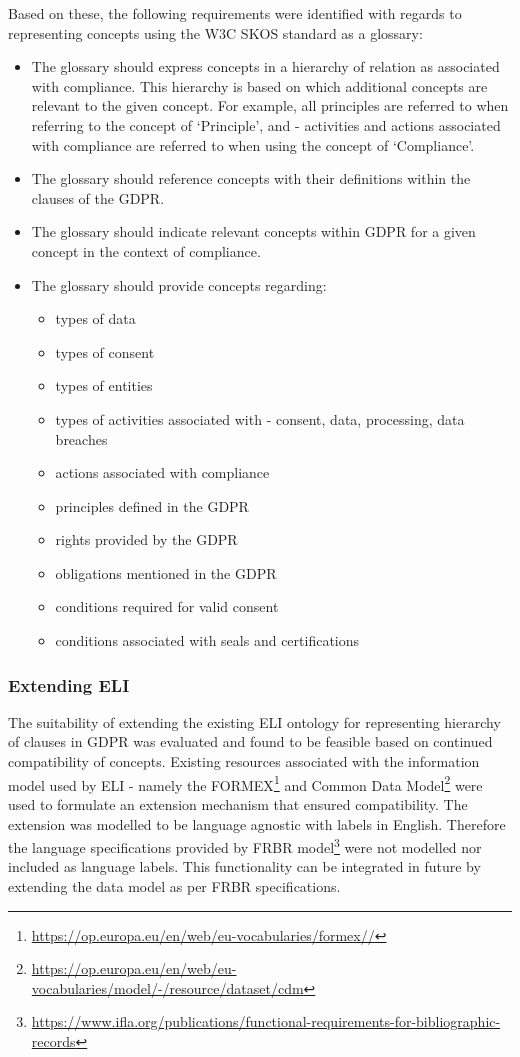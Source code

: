Based on these, the following requirements were identified with regards to representing concepts using the W3C SKOS standard as a glossary:
\begin{itemize}
    \item The glossary should express concepts in a hierarchy of relation as associated with compliance. This hierarchy is based on which additional concepts are relevant to the given concept. For example, all principles are referred to when referring to the concept of `Principle', and - activities and actions associated with compliance are referred to when using the concept of `Compliance'.
    \item The glossary should reference concepts with their definitions within the clauses of the GDPR.
    \item The glossary should indicate relevant concepts within GDPR for a given concept in the context of compliance.
    \item The glossary should provide concepts regarding:
    \begin{itemize}
        \item types of data
        \item types of consent
        \item types of entities
        \item types of activities associated with - consent, data, processing, data breaches
        \item actions associated with compliance
        \item principles defined in the GDPR
        \item rights provided by the GDPR
        \item obligations mentioned in the GDPR
        \item conditions required for valid consent
        \item conditions associated with seals and certifications
    \end{itemize}
\end{itemize}

\subsubsection{Extending ELI}
The suitability of extending the existing ELI ontology for representing hierarchy of clauses in GDPR was evaluated and found to be feasible based on continued compatibility of concepts. Existing resources associated with the information model used by ELI - namely the FORMEX\footnote{\url{https://op.europa.eu/en/web/eu-vocabularies/formex//}} and Common Data Model\footnote{\url{https://op.europa.eu/en/web/eu-vocabularies/model/-/resource/dataset/cdm}} were used to formulate an extension mechanism that ensured compatibility.
The extension was modelled to be language agnostic with labels in English. Therefore the language specifications provided by FRBR model\footnote{\url{https://www.ifla.org/publications/functional-requirements-for-bibliographic-records}} were not modelled nor included as language labels. This functionality can be integrated in future by extending the data model as per FRBR specifications.


